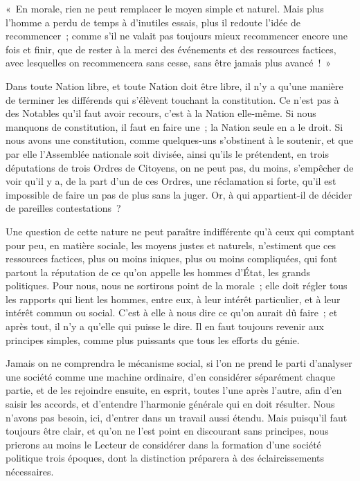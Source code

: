 \documentclass[french,twoside]{book} %
\newcommand\chaptercont{} %
\begin{document}
\chaptercont
\noindent « En morale, rien ne peut remplacer le moyen simple et naturel. Mais plus l’homme a perdu de temps à d’inutiles essais, plus il redoute l’idée de recommencer ; comme s’il ne valait pas toujours mieux recommencer encore une fois et finir, que de rester à la merci des événements et des ressources factices, avec lesquelles on recommencera sans cesse, sans être jamais plus avancé ! »\par
Dans toute Nation libre, et toute Nation doit être libre, il n’y a qu’une manière de terminer les différends qui s’élèvent touchant la constitution. Ce n’est pas à des Notables qu’il faut avoir recours, c’est à la Nation elle-même. Si nous manquons de constitution, il faut en faire une ; la Nation seule en a le droit. Si nous avons une constitution, comme quelques-uns s’obstinent à le soutenir, et que par elle l’Assemblée nationale soit divisée, ainsi qu’ils le prétendent, en trois députations de trois Ordres de Citoyens, on ne peut pas, du moins, s’empêcher de voir qu’il y a, de la part d’un de ces Ordres, une réclamation si forte, qu’il est impossible de faire un pas de plus sans la juger. Or, à qui appartient-il de décider de pareilles contestations ?\par
Une question de cette nature ne peut paraître indifférente qu’à ceux qui comptant pour peu, en matière sociale, les moyens justes et naturels, n’estiment que ces ressources factices, plus ou moins iniques, plus ou moins compliquées, qui font partout la réputation de ce qu’on appelle les hommes d’État, les grands politiques. Pour nous, nous ne sortirons point de la morale ; elle doit régler tous les rapports qui lient les hommes, entre eux, à leur intérêt particulier, et à leur intérêt commun ou social. C’est à elle à nous dire ce qu’on aurait dû faire ; et après tout, il n’y a qu’elle qui puisse le dire. Il en faut toujours revenir aux principes simples, comme plus puissants que tous les efforts du génie.\par
Jamais on ne comprendra le mécanisme social, si l’on ne prend le parti d’analyser une société comme une machine ordinaire, d’en considérer séparément chaque partie, et de les rejoindre ensuite, en esprit, toutes l’une après l’autre, afin d’en saisir les accords, et d’entendre l’harmonie générale qui en doit résulter. Nous n’avons pas besoin, ici, d’entrer dans un travail aussi étendu. Mais puisqu’il faut toujours être clair, et qu’on ne l’est point en discourant sans principes, nous prierons au moins le Lecteur de considérer dans la formation d’une société politique trois époques, dont la distinction préparera à des éclaircissements nécessaires.\par
\end{document}
